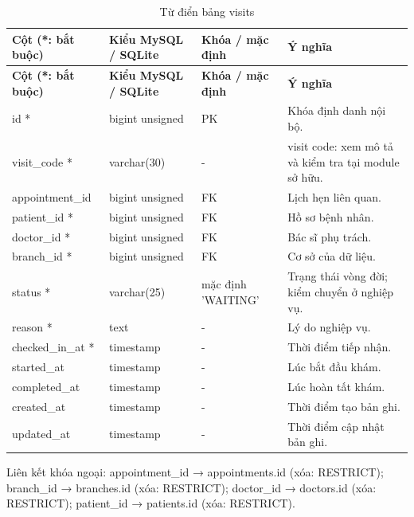 {\fontsize{10}{12}\selectfont\setlength{\tabcolsep}{3pt}\renewcommand{\arraystretch}{1.12}
\begin{longtable}{@{}L{\textwidth-4.86pt\relax} L{\textwidth-3.96pt\relax} L{\textwidth-2.88pt\relax} L{\textwidth-6.3pt\relax}@{}}
\caption{Từ điển bảng visits}\\
\toprule
\textbf{Cột (*:\allowbreak{} bắt buộc)} & \textbf{Kiểu My\allowbreak{}SQL /\allowbreak{} SQLite} & \textbf{Khóa /\allowbreak{} mặc định} & \textbf{Ý nghĩa}\\\midrule
\endfirsthead
\toprule
\textbf{Cột (*:\allowbreak{} bắt buộc)} & \textbf{Kiểu My\allowbreak{}SQL /\allowbreak{} SQLite} & \textbf{Khóa /\allowbreak{} mặc định} & \textbf{Ý nghĩa}\\\midrule
\endhead
\bottomrule\endlastfoot
id * & bigint unsigned & PK & Khóa định danh nội bộ.\allowbreak{}\\[1pt]
visit\_\allowbreak{}code * & varchar(30) & - & visit code:\allowbreak{} xem mô tả và kiểm tra tại module sở hữu.\allowbreak{}\\[1pt]
appointment\_\allowbreak{}id & bigint unsigned & FK & Lịch hẹn liên quan.\allowbreak{}\\[1pt]
patient\_\allowbreak{}id * & bigint unsigned & FK & Hồ sơ bệnh nhân.\allowbreak{}\\[1pt]
doctor\_\allowbreak{}id * & bigint unsigned & FK & Bác sĩ phụ trách.\allowbreak{}\\[1pt]
branch\_\allowbreak{}id * & bigint unsigned & FK & Cơ sở của dữ liệu.\allowbreak{}\\[1pt]
status * & varchar(25) & mặc định 'WAITING' & Trạng thái vòng đời; kiểm chuyển ở nghiệp vụ.\allowbreak{}\\[1pt]
reason * & text & - & Lý do nghiệp vụ.\allowbreak{}\\[1pt]
checked\_\allowbreak{}in\_\allowbreak{}at * & timestamp & - & Thời điểm tiếp nhận.\allowbreak{}\\[1pt]
started\_\allowbreak{}at & timestamp & - & Lúc bắt đầu khám.\allowbreak{}\\[1pt]
completed\_\allowbreak{}at & timestamp & - & Lúc hoàn tất khám.\allowbreak{}\\[1pt]
created\_\allowbreak{}at & timestamp & - & Thời điểm tạo bản ghi.\allowbreak{}\\[1pt]
updated\_\allowbreak{}at & timestamp & - & Thời điểm cập nhật bản ghi.\allowbreak{}\\[1pt]
\end{longtable}}
Liên kết khóa ngoại:\allowbreak{} appointment\_\allowbreak{}id → appointments.\allowbreak{}id (xóa:\allowbreak{} RESTRICT); branch\_\allowbreak{}id → branches.\allowbreak{}id (xóa:\allowbreak{} RESTRICT); doctor\_\allowbreak{}id → doctors.\allowbreak{}id (xóa:\allowbreak{} RESTRICT); patient\_\allowbreak{}id → patients.\allowbreak{}id (xóa:\allowbreak{} RESTRICT).\allowbreak{}

